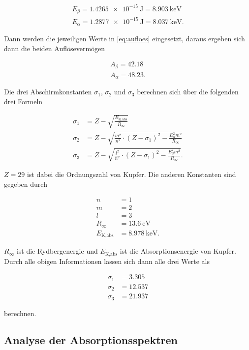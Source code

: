 \begin{align*}
    E_ \beta  = \SI{1.4265e-15}{\joule} = \SI{8.903}{\kilo\electronvolt}\\
    E_ \alpha = \SI{1.2877e-15}{\joule} = \SI{8.037}{\kilo\electronvolt}.
\end{align*}

Dann werden die jeweiligen Werte in \eqref{eq:aufloes} eingesetzt, daraus ergeben sich dann die beiden Auflösevermögen

\begin{align*}
    A_ \beta  = 42.18\\
    A_ \alpha = 48.23.
\end{align*}

Die drei Abschirmkonstanten $\sigma_1$, $\sigma_2$ und $\sigma_3$ berechnen sich über die folgenden drei Formeln

\begin{align*}
    \sigma_1 &= Z - \sqrt{\frac{E_\text{K,abs}}{R_\infty}}\\
    \sigma_2 &= Z - \sqrt{\frac{m^2}{n^2} \cdot \left(Z - \sigma_1\right)^2 - \frac{E_ \alpha ^2 m^2}{R_\infty}}\\
    \sigma_3 &= Z - \sqrt{\frac{l^2}{n^2} \cdot \left(Z - \sigma_1\right)^2 - \frac{E_ \beta ^2 m^2}{R_\infty}}.
\end{align*}

$Z = 29$ ist dabei die Ordnungszahl von Kupfer.
Die anderen Konstanten sind gegeben durch

\begin{align*}
    n &= 1\\
    m &= 2\\
    l &= 3\\
    R_\infty &= \SI{13.6}{\electronvolt}\\
    E_\text{K,abs} &= \SI{8.978}{\kilo\electronvolt}.
\end{align*}

$R_\infty$ ist die Rydbergenergie und $E_\text{K,abs}$ ist die Absorptionsenergie von Kupfer. \cite{V602} \cite{absorption}
Durch alle obigen Informationen lassen sich dann alle drei Werte als 

\begin{align*}
    \sigma_1 &= 3.305\\
    \sigma_2 &= 12.537\\
    \sigma_3 &= 21.937
\end{align*}

berechnen.

\subsection{Analyse der Absorptionsspektren}
\label{ssec:3}

